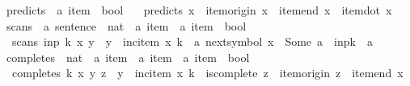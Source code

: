 %
\begin{isabellebody}%
%
%
\isadelimtheory
%
\endisadelimtheory
%
\isatagtheory
%
\endisatagtheory
{\isafoldtheory}%
%
\isadelimtheory
%
\endisadelimtheory
%
\isadelimdocument
%
\endisadelimdocument
%
\isatagdocument
%
\isamarkuptrue%
%
\isamarkuptrue%
%
\isamarkuptrue%
%
\endisatagdocument
{\isafolddocument}%
%
\isadelimdocument
%
\endisadelimdocument
{}\isamarkupfalse%
\ predicts\ {\isacharcolon}{\kern0pt}{\isacharcolon}{\kern0pt}\ {\isachardoublequoteopen}{\isacharprime}{\kern0pt}a\ item\ {\isasymRightarrow}\ bool{\isachardoublequoteclose}\ \isanewline
\ \ {\isachardoublequoteopen}predicts\ x\ {\isasymlongleftrightarrow}\ item{\isacharunderscore}{\kern0pt}origin\ x\ {\isacharequal}{\kern0pt}\ item{\isacharunderscore}{\kern0pt}end\ x\ {\isasymand}\ item{\isacharunderscore}{\kern0pt}dot\ x\ {\isacharequal}{\kern0pt}\ {}{\isachardoublequoteclose}\isanewline
\isanewline
{}\isamarkupfalse%
\ scans\ {\isacharcolon}{\kern0pt}{\isacharcolon}{\kern0pt}\ {\isachardoublequoteopen}{\isacharprime}{\kern0pt}a\ sentence\ {\isasymRightarrow}\ nat\ {\isasymRightarrow}\ {\isacharprime}{\kern0pt}a\ item\ {\isasymRightarrow}\ {\isacharprime}{\kern0pt}a\ item\ {\isasymRightarrow}\ bool{\isachardoublequoteclose}\ \isanewline
\ \ {\isachardoublequoteopen}scans\ inp\ k\ x\ y\ {\isasymlongleftrightarrow}\ y\ {\isacharequal}{\kern0pt}\ inc{\isacharunderscore}{\kern0pt}item\ x\ k\ {\isasymand}\ {\isacharparenleft}{\kern0pt}{\isasymexists}a{\isachardot}{\kern0pt}\ next{\isacharunderscore}{\kern0pt}symbol\ x\ {\isacharequal}{\kern0pt}\ Some\ a\ {\isasymand}\ inp{\isacharbang}{\kern0pt}{\isacharparenleft}{\kern0pt}k{\isacharminus}{\kern0pt}{}{\isacharparenright}{\kern0pt}\ {\isacharequal}{\kern0pt}\ a{\isacharparenright}{\kern0pt}{\isachardoublequoteclose}\isanewline
\isanewline
{}\isamarkupfalse%
\ completes\ {\isacharcolon}{\kern0pt}{\isacharcolon}{\kern0pt}\ {\isachardoublequoteopen}nat\ {\isasymRightarrow}\ {\isacharprime}{\kern0pt}a\ item\ {\isasymRightarrow}\ {\isacharprime}{\kern0pt}a\ item\ {\isasymRightarrow}\ {\isacharprime}{\kern0pt}a\ item\ {\isasymRightarrow}\ bool{\isachardoublequoteclose}\ \isanewline
\ \ {\isachardoublequoteopen}completes\ k\ x\ y\ z\ {\isasymlongleftrightarrow}\ y\ {\isacharequal}{\kern0pt}\ inc{\isacharunderscore}{\kern0pt}item\ x\ k\ {\isasymand}\ is{\isacharunderscore}{\kern0pt}complete\ z\ {\isasymand}\ item{\isacharunderscore}{\kern0pt}origin\ z\ {\isacharequal}{\kern0pt}\ item{\isacharunderscore}{\kern0pt}end\ x\ {\isasymand}\isanewline

\end{isabellebody}
